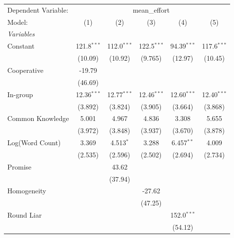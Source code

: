 
\begingroup
\centering
\begin{tabular}{lccccc}
   \tabularnewline \midrule \midrule
   Dependent Variable: & \multicolumn{5}{c}{mean\_effort}\\
   Model:           & (1)           & (2)           & (3)           & (4)           & (5)\\  
   \midrule
   \emph{Variables}\\
   Constant         & 121.8$^{***}$ & 112.0$^{***}$ & 122.5$^{***}$ & 94.39$^{***}$ & 117.6$^{***}$\\   
                    & (10.09)       & (10.92)       & (9.765)       & (12.97)       & (10.45)\\   
   Cooperative      & -19.79        &               &               &               &   \\   
                    & (46.69)       &               &               &               &   \\   
   In-group         & 12.36$^{***}$ & 12.77$^{***}$ & 12.46$^{***}$ & 12.60$^{***}$ & 12.40$^{***}$\\   
                    & (3.892)       & (3.824)       & (3.905)       & (3.664)       & (3.868)\\   
   Common Knowledge & 5.001         & 4.967         & 4.836         & 3.308         & 5.655\\   
                    & (3.972)       & (3.848)       & (3.937)       & (3.670)       & (3.878)\\   
   Log(Word Count)  & 3.369         & 4.513$^{*}$   & 3.288         & 6.457$^{**}$  & 4.009\\   
                    & (2.535)       & (2.596)       & (2.502)       & (2.694)       & (2.734)\\   
   Promise          &               & 43.62         &               &               &   \\   
                    &               & (37.94)       &               &               &   \\   
   Homogeneity      &               &               & -27.62        &               &   \\   
                    &               &               & (47.25)       &               &   \\   
   Round Liar       &               &               &               & 152.0$^{***}$ &   \\   
                    &               &               &               & (54.12)       &   \\   

\end{tabular}
